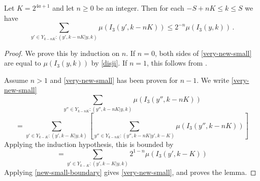 \begin{lemma}
    \label{smaller-boundary}
    Let $K = 2^{4a+1}$
    and let $n\ge 0$ be an integer. Then
    for each $-S+nK\le k\le S$ we have
    \begin{equation}
            \label{very-new-small}
            \sum_{y'\in Y_{k-nK}: (y',k-nK|y,k)}\mu(I_3(y',k-nK)) \le 2^{-n} \mu(I_3(y,k))\,.
        \end{equation}
\end{lemma}
\begin{proof}
    We prove this by induction on $n$. If $n=0$,
    both sides of \eqref{very-new-small} are equal to
    $\mu(I_3(y,k))$ by \eqref{disji}. If $n=1$, this follows from .

    Assume $n>1$ and \eqref{very-new-small} has been proven for $n-1$.
    We write \eqref{very-new-small}
    \begin{equation}
        \sum_{y''\in Y_{k-nK}: (y'',k-nK|y,k)}\mu(I_3(y'',k-nK))
    \end{equation}
    \begin{equation}
        = \sum_{y'\in Y_{k-K}:(y',k-K|y,k)} \left[ \sum_{y''\in Y_{k-nK}: (y'',k-nK|y',k-K)}\mu(I_3(y'',k-nK)) \right]
    \end{equation}
    Applying the induction hypothesis, this is bounded by
    \begin{equation}
        = \sum_{y'\in Y_{k-K}:(y',k-K|y,k)} 2^{1-n}\mu(I_3(y',k-K))
    \end{equation}
    Applying \eqref{new-small-boundary} gives
    \eqref{very-new-small}, and proves the lemma.
\end{proof}

